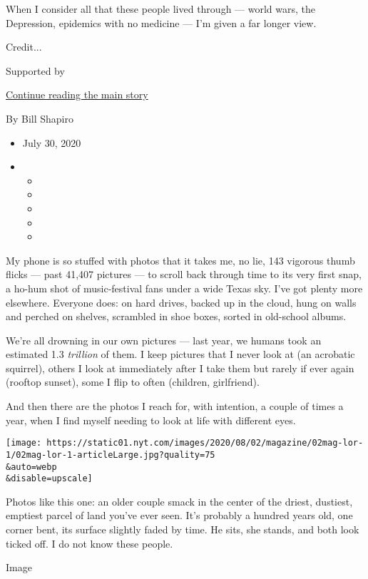 When I consider all that these people lived through --- world wars, the
Depression, epidemics with no medicine --- I'm given a far longer view.

Credit...

Supported by

\protect\hyperlink{after-sponsor}{Continue reading the main story}

By Bill Shapiro

\begin{itemize}
\item
  July 30, 2020
\item
  \begin{itemize}
  \item
  \item
  \item
  \item
  \item
  \end{itemize}
\end{itemize}

My phone is so stuffed with photos that it takes me, no lie, 143
vigorous thumb flicks --- past 41,407 pictures --- to scroll back
through time to its very first snap, a ho-hum shot of music-festival
fans under a wide Texas sky. I've got plenty more elsewhere. Everyone
does: on hard drives, backed up in the cloud, hung on walls and perched
on shelves, scrambled in shoe boxes, sorted in old-school albums.

We're all drowning in our own pictures --- last year, we humans took an
estimated 1.3 \emph{trillion} of them. I keep pictures that I never look
at (an acrobatic squirrel), others I look at immediately after I take
them but rarely if ever again (rooftop sunset), some I flip to often
(children, girlfriend).

And then there are the photos I reach for, with intention, a couple of
times a year, when I find myself needing to look at life with different
eyes.

\texttt{[image: https://static01.nyt.com/images/2020/08/02/magazine/02mag-lor-1/02mag-lor-1-articleLarge.jpg?quality=75\\\&auto=webp\\\&disable=upscale]}

Photos like this one: an older couple smack in the center of the driest,
dustiest, emptiest parcel of land you've ever seen. It's probably a
hundred years old, one corner bent, its surface slightly faded by time.
He sits, she stands, and both look ticked off. I do not know these
people.

Image

